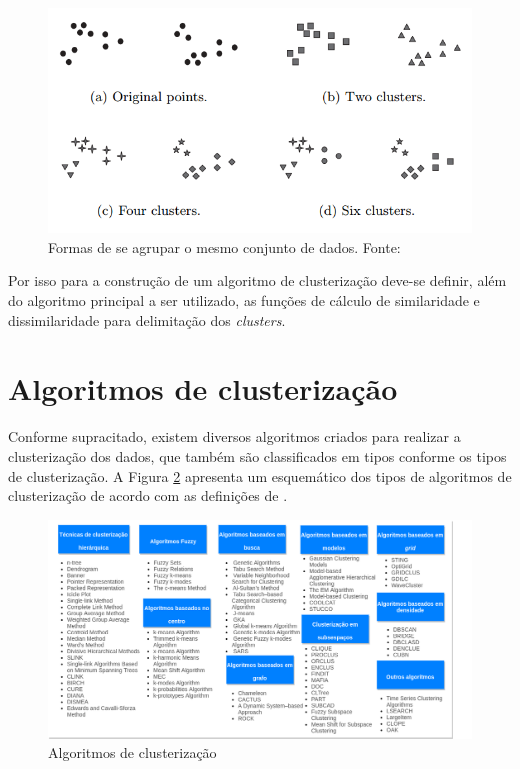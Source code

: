 \begin{figure}[ht!]
\centering
\includegraphics[scale=0.4]{figuras/clusters_difficulty.png}
\caption{Formas de se agrupar o mesmo conjunto de dados. Fonte: \cite{tan2013data}}
\label{fig:clusters_difficulty}
\end{figure}

Por isso para a construção de um algoritmo de clusterização deve-se definir, além do algoritmo principal a ser utilizado, as funções
de cálculo de similaridade e dissimilaridade para delimitação dos \textit{clusters}.

\section{Algoritmos de clusterização}
Conforme supracitado, existem diversos algoritmos criados para realizar a clusterização dos dados, que também são classificados em tipos
conforme os tipos de clusterização. A Figura \ref{fig:tipos_algoritmo} apresenta um esquemático dos tipos de algoritmos de clusterização de acordo
com as definições de .

\begin{figure}[h!]
\centering
\includegraphics[scale=0.5]{figuras/algoritmos.png}
\caption{Algoritmos de clusterização}
\label{fig:tipos_algoritmo}
\end{figure}


